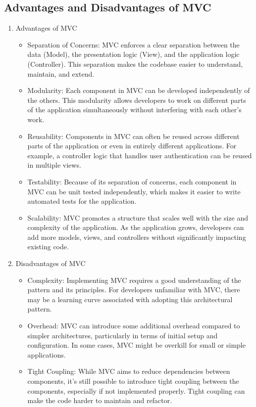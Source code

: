 \documentclass[conference]{IEEEtran}
\begin{document}
\begin{itemize}
\subsection{Advantages and Disadvantages of MVC}
\begin{enumerate}
    \item Advantages of MVC
\begin{itemize}
    \item Separation of Concerns: MVC enforces a clear separation between the data (Model), the presentation logic (View), and the application logic (Controller). This separation makes the codebase easier to understand, maintain, and extend.
    \item Modularity: Each component in MVC can be developed independently of the others. This modularity allows developers to work on different parts of the application simultaneously without interfering with each other's work.
    \item Reusability: Components in MVC can often be reused across different parts of the application or even in entirely different applications. For example, a controller logic that handles user authentication can be reused in multiple views.
    \item Testability: Because of its separation of concerns, each component in MVC can be unit tested independently, which makes it easier to write automated tests for the application.
    \item Scalability: MVC promotes a structure that scales well with the size and complexity of the application. As the application grows, developers can add more models, views, and controllers without significantly impacting existing code.
\end{itemize}
\item Disadvantages of MVC
\begin{itemize}
\item Complexity: Implementing MVC requires a good understanding of the pattern and its principles. For developers unfamiliar with MVC, there may be a learning curve associated with adopting this architectural pattern.
\item Overhead: MVC can introduce some additional overhead compared to simpler architectures, particularly in terms of initial setup and configuration. In some cases, MVC might be overkill for small or simple applications.
\item Tight Coupling: While MVC aims to reduce dependencies between components, it's still possible to introduce tight coupling between the components, especially if not implemented properly. Tight coupling can make the code harder to maintain and refactor.

\end{itemize}
\end{enumerate}
\end{itemize}
\end{document}

